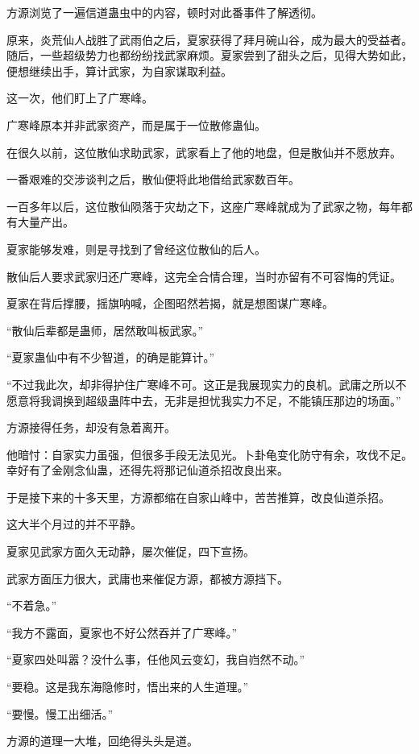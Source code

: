 \begin{this_body}
方源浏览了一遍信道蛊虫中的内容，顿时对此番事件了解透彻。

原来，炎荒仙人战胜了武雨伯之后，夏家获得了拜月碗山谷，成为最大的受益者。随后，一些超级势力也都纷纷找武家麻烦。夏家尝到了甜头之后，见得大势如此，便想继续出手，算计武家，为自家谋取利益。

这一次，他们盯上了广寒峰。

广寒峰原本并非武家资产，而是属于一位散修蛊仙。

在很久以前，这位散仙求助武家，武家看上了他的地盘，但是散仙并不愿放弃。

一番艰难的交涉谈判之后，散仙便将此地借给武家数百年。

一百多年以后，这位散仙陨落于灾劫之下，这座广寒峰就成为了武家之物，每年都有大量产出。

夏家能够发难，则是寻找到了曾经这位散仙的后人。

散仙后人要求武家归还广寒峰，这完全合情合理，当时亦留有不可容悔的凭证。

夏家在背后撑腰，摇旗呐喊，企图昭然若揭，就是想图谋广寒峰。

“散仙后辈都是蛊师，居然敢叫板武家。”

“夏家蛊仙中有不少智道，的确是能算计。”

“不过我此次，却非得护住广寒峰不可。这正是我展现实力的良机。武庸之所以不愿意将我调换到超级蛊阵中去，无非是担忧我实力不足，不能镇压那边的场面。”

方源接得任务，却没有急着离开。

他暗忖：自家实力虽强，但很多手段无法见光。卜卦龟变化防守有余，攻伐不足。幸好有了金刚念仙蛊，还得先将那记仙道杀招改良出来。

于是接下来的十多天里，方源都缩在自家山峰中，苦苦推算，改良仙道杀招。

这大半个月过的并不平静。

夏家见武家方面久无动静，屡次催促，四下宣扬。

武家方面压力很大，武庸也来催促方源，都被方源挡下。

“不着急。”

“我方不露面，夏家也不好公然吞并了广寒峰。”

“夏家四处叫嚣？没什么事，任他风云变幻，我自岿然不动。”

“要稳。这是我东海隐修时，悟出来的人生道理。”

“要慢。慢工出细活。”

方源的道理一大堆，回绝得头头是道。


\end{this_body}
